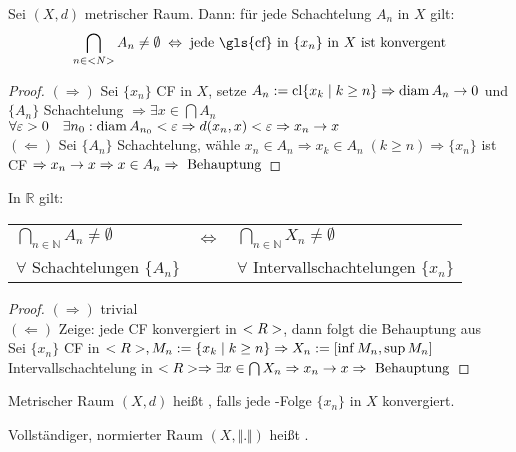 \begin{theorem}
	Sei $(X,d)$ metrischer Raum. Dann: für jede Schachtelung $A_n$ in $X$ gilt:\[ \bigcap_{n\in\mathbb{N}} A_n\neq \emptyset \;\Leftrightarrow \; \text{jede \gls{cf} in $\{x_n\}$ in $X$ ist konvergent} \]
\end{theorem}
\begin{proof}
	$(\Rightarrow)$ Sei $\{x_n\}$ CF in $X$, setze $A_n:=\operatorname{cl}\{x_k\mid k\ge n\}\Rightarrow\operatorname{diam} A_n\to 0$ und $\{A_n\}$ Schachtelung $\Rightarrow\exists x\in\bigcap A_n$ \\
	$\forall\varepsilon>0\quad\exists n_0:\operatorname{diam} A_{n_0}<\varepsilon\Rightarrow d(x_n,x)<\varepsilon\Rightarrow x_n\to x$ \\
	$(\Leftarrow)$ Sei $\{A_n\}$ Schachtelung, wähle $x_n\in A_n\Rightarrow x_k\in A_n\; (k\ge n)\Rightarrow \{x_n\}$ ist CF $\Rightarrow x_n\to x\Rightarrow x\in A_n\Rightarrow \text{ Behauptung}$
\end{proof}

\begin{lemma}
	In $\mathbb{R}$ gilt:
	\begin{center}
		\begin{tabular}{lcl}
			$\bigcap_{n\in\mathbb{N}} A_n\neq \emptyset$ & $\Leftrightarrow$ & $\bigcap_{n\in\mathbb{N}} X_n\neq \emptyset$ \\[5pt]
			$\forall$ Schachtelungen $\{A_n\}$ && $\forall$ Intervallschachtelungen $\{x_n\}$
		\end{tabular}
	\end{center}
\end{lemma}
\begin{proof}
	$(\Rightarrow)$ trivial \\
	$(\Leftarrow)$ Zeige: jede CF konvergiert in $<R>$, dann folgt die Behauptung aus  \\
	Sei $\{x_n\}$ CF in $<R>, M_n:=\{x_k\mid k\ge n\}\Rightarrow X_n:=[\inf M_n,\sup M_n]$ Intervallschachtelung in $<R>\Rightarrow\exists x\in\bigcap X_n\Rightarrow x_n\to x\Rightarrow \text{ Behauptung}$
\end{proof}

\begin{*definition}[Vollständigkeit]
	Metrischer Raum $(X,d)$ heißt , falls jede -Folge $\{x_n\}$ in $X$ konvergiert.
	
	Vollständiger, normierter Raum $(X,\Vert .\Vert)$ heißt .
\end{*definition}

